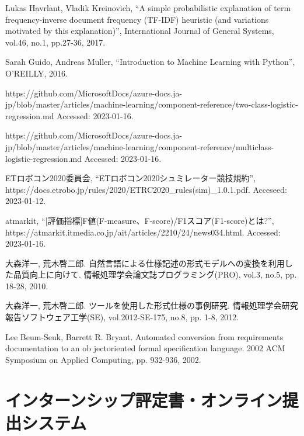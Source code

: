 \documentclass[uplatex, report, a4j, 10pt]{jsbook}
\begin{document}
\begin{thebibliography}{10}
    Lukas Havrlant, Vladik Kreinovich,  “A simple probabilistic explanation of term frequency-inverse document frequency (TF-IDF) heuristic (and variations motivated by this explanation)”, International Journal of General Systems, vol.46, no.1, pp.27-36, 2017.

    Sarah Guido, Andreas Muller, “Introduction to Machine Learning with Python”, O'REILLY, 2016.

    https:\slash \slash github.com\slash MicrosoftDocs\slash azure-docs.ja-jp\slash blob\slash master\slash articles\slash machine-learning\slash component-reference\slash two-class-logistic-regression.md Accessed: 2023-01-16.

    https:\slash \slash github.com\slash MicrosoftDocs\slash azure-docs.ja-jp\slash blob\slash master\slash articles\slash machine-learning\slash component-reference\slash multiclass-logistic-regression.md Accessed: 2023-01-16.

    ETロボコン2020委員会,  “ETロボコン2020シュミレーター競技規約”, https:\slash \slash docs.etrobo.jp\slash rules\slash 2020\slash ETRC2020\_rules(sim)\_1.0.1.pdf. Acceseed: 2023-01-12.

    atmarkit, ``[評価指標]F値(F-measure、F-score)\slash F1スコア(F1-score)とは?'', https:\slash \slash atmarkit.itmedia.co.jp\slash ait\slash articles\slash 2210\slash 24\slash news034.html. Accessed: 2023-01-16.

    大森洋一, 荒木啓二郎. 
    自然言語による仕様記述の形式モデルへの変換を利用した品質向上に向けて. 
    情報処理学会論文誌プログラミング(PRO), 
    vol.3, no.5, pp. 18-28, 2010.

    大森洋一, 荒木啓二郎. 
    ツールを使用した形式仕様の事例研究. 
    情報処理学会研究報告ソフトウェア工学(SE), 
    vol.2012-SE-175, no.8, pp. 1-8, 2012.

    Lee Beum-Seuk, Barrett R. Bryant. 
    Automated conversion from requirements documentation to an ob jectoriented formal specification language. 
    2002 ACM Symposium on Applied Computing, pp. 932-936, 2002.

\end{thebibliography}

\appendix  %

\chapter{インターンシップ評定書・オンライン提出システム}\label{ET_Specifications}
\end{document}
